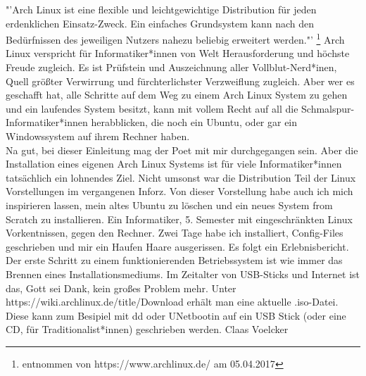 {"'Arch Linux ist eine flexible und leichtgewichtige Distribution für jeden erdenklichen Einsatz-Zweck. Ein einfaches Grundsystem kann nach den Bedürfnissen des jeweiligen Nutzers nahezu beliebig erweitert werden."' \footnote{entnommen von https://www.archlinux.de/ am 05.04.2017}
}{
    Arch Linux verspricht für Informatiker*innen von Welt Herausforderung und höchste Freude zugleich. Es ist Prüfstein und Auszeichnung aller Vollblut-Nerd*inen, Quell größter Verwirrung und fürchterlichster Verzweiflung zugleich. Aber wer es geschafft hat, alle Schritte auf dem Weg zu einem Arch Linux System zu gehen und ein laufendes System besitzt, kann mit vollem Recht auf all die Schmalspur-Informatiker*innen herabblicken, die noch ein Ubuntu, oder gar ein Windowssystem auf ihrem Rechner haben. \\


    Na gut, bei dieser Einleitung mag der Poet mit mir durchgegangen sein. Aber die Installation eines eigenen Arch Linux Systems ist für viele Informatiker*innen tatsächlich ein lohnendes Ziel. Nicht umsonst war die Distribution Teil der Linux Vorstellungen im vergangenen Inforz. Von dieser Vorstellung habe auch ich mich inspirieren lassen, mein altes Ubuntu zu löschen und ein neues System from Scratch zu installieren. Ein Informatiker, 5. Semester mit eingeschränkten Linux Vorkentnissen, gegen den Rechner. Zwei Tage habe ich installiert, Config-Files geschrieben und mir ein Haufen Haare ausgerissen. Es folgt ein Erlebnisbericht. \\

    Der erste Schritt zu einem funktionierenden Betriebssystem ist wie immer das Brennen eines Installationsmediums. Im Zeitalter von USB-Sticks und Internet ist das, Gott sei Dank, kein großes Problem mehr. Unter https://wiki.archlinux.de/title/Download erhält man eine aktuelle .iso-Datei. Diese kann zum Besipiel mit dd oder UNetbootin auf ein USB Stick (oder eine CD, für Traditionalist*innen) geschrieben werden.
}
{Claas Voelcker}
